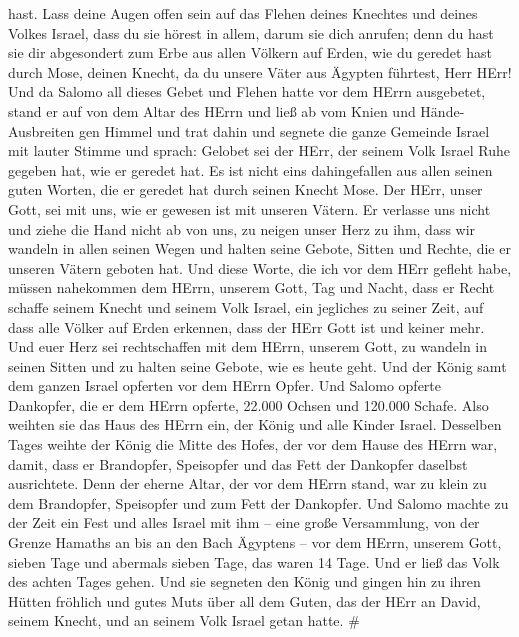 hast.  Lass deine Augen offen sein auf das Flehen deines
Knechtes und deines Volkes Israel, dass du sie hörest in allem, darum
sie dich anrufen;  denn du hast sie dir abgesondert zum
Erbe aus allen Völkern auf Erden, wie du geredet hast durch Mose, deinen
Knecht, da du unsere Väter aus Ägypten führtest, Herr HErr!
 Und da Salomo all dieses Gebet und Flehen hatte vor dem
HErrn ausgebetet, stand er auf von dem Altar des HErrn und ließ ab vom
Knien und Hände-Ausbreiten gen Himmel  und trat dahin und
segnete die ganze Gemeinde Israel mit lauter Stimme und sprach:
 Gelobet sei der HErr, der seinem Volk Israel Ruhe gegeben
hat, wie er geredet hat. Es ist nicht eins dahingefallen aus allen
seinen guten Worten, die er geredet hat durch seinen Knecht Mose.
 Der HErr, unser Gott, sei mit uns, wie er gewesen ist mit
unseren Vätern. Er verlasse uns nicht und ziehe die Hand nicht ab von
uns,  zu neigen unser Herz zu ihm, dass wir wandeln in
allen seinen Wegen und halten seine Gebote, Sitten und Rechte, die er
unseren Vätern geboten hat.  Und diese Worte, die ich vor
dem HErr gefleht habe, müssen nahekommen dem HErrn, unserem Gott, Tag
und Nacht, dass er Recht schaffe seinem Knecht und seinem Volk Israel,
ein jegliches zu seiner Zeit,  auf dass alle Völker auf
Erden erkennen, dass der HErr Gott ist und keiner mehr. 
Und euer Herz sei rechtschaffen mit dem HErrn, unserem Gott, zu wandeln
in seinen Sitten und zu halten seine Gebote, wie es heute geht.
 Und der König samt dem ganzen Israel opferten vor dem
HErrn Opfer.  Und Salomo opferte Dankopfer, die er dem
HErrn opferte, 22.000 Ochsen und 120.000 Schafe. Also weihten sie das
Haus des HErrn ein, der König und alle Kinder Israel. 
Desselben Tages weihte der König die Mitte des Hofes, der vor dem Hause
des HErrn war, damit, dass er Brandopfer, Speisopfer und das Fett der
Dankopfer daselbst ausrichtete. Denn der eherne Altar, der vor dem HErrn
stand, war zu klein zu dem Brandopfer, Speisopfer und zum Fett der
Dankopfer.  Und Salomo machte zu der Zeit ein Fest und
alles Israel mit ihm -- eine große Versammlung, von der Grenze Hamaths
an bis an den Bach Ägyptens -- vor dem HErrn, unserem Gott, sieben Tage
und abermals sieben Tage, das waren 14 Tage.  Und er ließ
das Volk des achten Tages gehen. Und sie segneten den König und gingen
hin zu ihren Hütten fröhlich und gutes Muts über all dem Guten, das der
HErr an David, seinem Knecht, und an seinem Volk Israel getan hatte. \#
